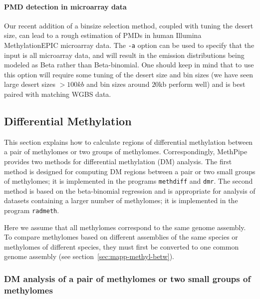 \documentclass[10pt]{article}
\newcommand{\prog}[1]{\texttt{#1}}
\newcommand{\op}[1]{\texttt{#1}}
\begin{document}
\paragraph{PMD detection in microarray data}

Our recent addition of a binsize selection method, coupled with tuning the desert
size, can lead to a rough estimation of PMDs in human Illumina MethylationEPIC
microarray data. The \op{-a} option can be used to specify that the input is all
microarray data, and will
result in the emission distributions being modeled as Beta rather than
Beta-binomial. One should keep in mind that to use this option will require
some tuning of the desert size and bin sizes (we have seen large desert sizes
$>100kb$ and bin sizes around $20$kb perform well) and is best paired with
matching WGBS data.

\subsection{Differential Methylation}
\label{sec:differential_methylation}

This section explains how to calculate regions of differential methylation
between a pair of methylomes or two groups of methylomes. Correspondingly,
MethPipe provides two methods for differential methylation (DM) analysis.
The first method is designed for computing DM regions between a pair or two
small groups of methylomes; it is implemented in the programs \prog{methdiff}
and \prog{dmr}. The second method is based on the beta-binomial
regression and is appropriate for analysis of datasets containing a larger
number of methylomes; it is implemented in the program \prog{radmeth}.

Here we assume that all methylomes correspond to the same genome
assembly. To compare methylomes based on different assemblies of the
same species or methylomes of different species, they must first be
converted to one common genome assembly (see
section~\ref{sec:mapp-methyl-betw}).

\subsubsection{DM analysis of a pair of methylomes or two small groups of
                           methylomes}
\end{document}
